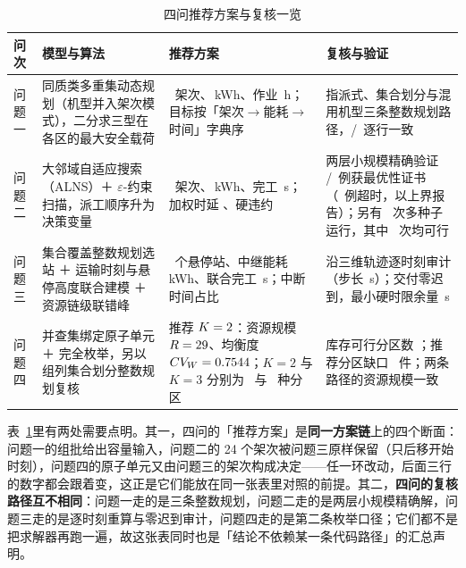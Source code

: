 \begin{table}[htbp]
	\centering
	\small
	\caption{四问推荐方案与复核一览}
	\label{tab:overview}
	\begin{tabularx}{\textwidth}{@{}>{\hsize=0.62\hsize}X >{\hsize=1.05\hsize}X >{\hsize=1.28\hsize}X >{\hsize=1.05\hsize}X@{}}
		\toprule
		问次 & 模型与算法 & 推荐方案 & 复核与验证 \\
		\midrule
		问题一 & 同质类多重集动态规划（机型并入架次模式），二分求三型在各区的最大安全载荷 & \mtQoneTrips\ 架次、\mtQoneEnergy\,kWh、作业 \mtQoneWorkTimeH\,h；目标按「架次$\to$能耗$\to$时间」字典序 & 指派式、集合划分与混用机型三条整数规划路径，\mtQoneIlpAgree/\mtQoneIlpCases\ 逐行一致 \\
		\midrule
		问题二 & 大邻域自适应搜索（ALNS）＋ $\varepsilon$-约束扫描，派工顺序升为决策变量 & \mtQtwoRecTrips\ 架次、\mtQtwoEnergy\,kWh、完工 \mtQtwoMakespan\,s；加权时延 \mtQtwoTardiness、硬违约 \mtQtwoHardViol & 两层小规模精确验证 \mtQtwoExactProved/\mtQtwoExactCases\ 例获最优性证书（\mtQtwoExactTimeout\ 例超时，以上界报告）；另有 \mtQtwoSeedRuns\ 次多种子运行，其中 \mtQtwoSeedFeas\ 次均可行 \\
		\midrule
		问题三 & 集合覆盖整数规划选站 ＋ 运输时刻与悬停高度联合建模 ＋ 资源链级联错峰 & \mtQthreeStations\ 个悬停站、中继能耗 \mtQthreeRelayEnergy\,kWh、联合完工 \mtQthreeJointDone\,s；中断时间占比 \mtQthreeGap & 沿三维轨迹逐时刻审计（步长 \mtQthreeCoverageStep\,s）；交付零迟到，最小硬时限余量 \mtQthreeMinMarginFine\,s \\
		\midrule
		问题四 & 并查集绑定原子单元 ＋ 完全枚举，另以组列集合划分整数规划复核 & 推荐 $K=2$：资源规模 $R=29$、均衡度 $CV_W=0.7544$；$K=2$ 与 $K=3$ 分别为 \mtQfourPartKTwo\ 与 \mtQfourPartKThree\ 种分区 & 库存可行分区数 \mtQfourFeasible；推荐分区缺口 \mtQfourGapSum\ 件；两条路径的资源规模一致 \\
		\bottomrule
	\end{tabularx}
\end{table}

表~\ref{tab:overview}里有两处需要点明。其一，四问的「推荐方案」是\textbf{同一方案链}上的四个断面：问题一的组批给出容量输入，问题二的 24 个架次被问题三原样保留（只后移开始时刻），问题四的原子单元又由问题三的架次构成决定——任一环改动，后面三行的数字都会跟着变，这正是它们能放在同一张表里对照的前提。其二，\textbf{四问的复核路径互不相同}：问题一走的是三条整数规划，问题二走的是两层小规模精确解，问题三走的是逐时刻重算与零迟到审计，问题四走的是第二条枚举口径；它们都不是把求解器再跑一遍，故这张表同时也是「结论不依赖某一条代码路径」的汇总声明。
